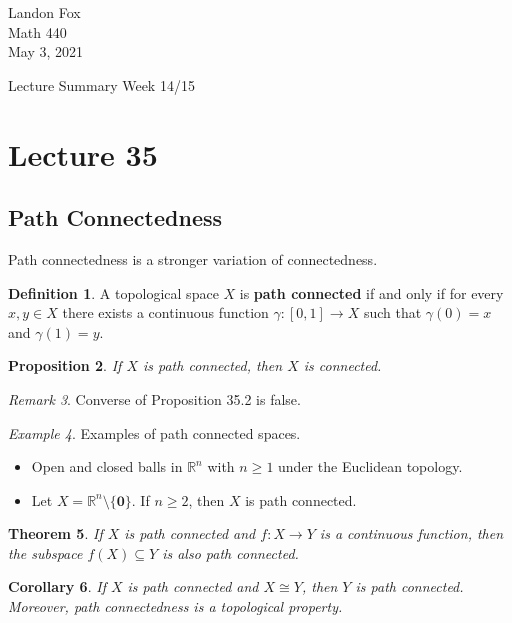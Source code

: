 \documentclass[ 12pt ]{article}
\newcounter{lecture_num}
\theoremstyle{plain}
\theoremstyle{plain}
\newtheorem{theorem}{Theorem}[lecture_num]
\newtheorem{proposition}[theorem]{Proposition}
\newtheorem{corollary}[theorem]{Corollary}
\theoremstyle{definition}
\newtheorem{definition}[theorem]{Definition}
\theoremstyle{remark}
\newtheorem{remark}[theorem]{Remark}
\newtheorem{example}[theorem]{Example}
\begin{document}
\noindent Landon Fox \\
\noindent Math 440 \\
\noindent May 3, 2021

\begin{center}
	\Large Lecture Summary Week 14/15
\end{center}

\setcounter{lecture_num}{35}
\setcounter{theorem}{0}
\section*{Lecture 35}

\subsection*{Path Connectedness}

Path connectedness is a stronger variation of connectedness.

\begin{definition}
	A topological space $X$ is \textbf{path connected} if and only if for every $x, y \in X$ there exists a continuous function $\gamma : [0, 1] \to X$ such that $\gamma(0) = x$ and
	$\gamma(1) = y$.
\end{definition}

\begin{proposition}
	If $X$ is path connected, then $X$ is connected.
\end{proposition}

\begin{remark}
	Converse of Proposition 35.2 is false.
\end{remark}

\begin{example}
	Examples of path connected spaces.
	\begin{itemize}
		\item Open and closed balls in $\mathbb{R}^n$ with $n \geq 1$ under the Euclidean topology.
		\item Let $X = \mathbb{R}^n \setminus \{ \textbf{0} \}$. If $n \geq 2$, then $X$ is path connected.
	\end{itemize}
\end{example}

\begin{theorem}
	If $X$ is path connected and $f : X \to Y$ is a continuous function, then the subspace $f(X) \subseteq Y$ is also path connected.
\end{theorem}

\begin{corollary}
	If $X$ is path connected and $X \cong Y$, then $Y$ is path connected. Moreover, path connectedness is a topological property.
\end{corollary}
\end{document}
